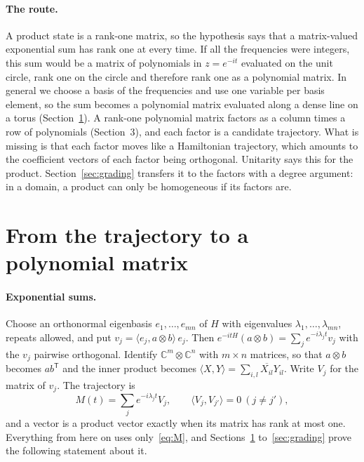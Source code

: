 \documentclass[11pt]{article}
\theoremstyle{remark}
\newcommand{\C}{\mathbb{C}}
\newcommand{\ip}[2]{\langle #1,#2\rangle}
\begin{document}
\paragraph{The route.} A product state is a rank-one matrix, so the hypothesis says that a
matrix-valued exponential sum has rank one at every time. If all the frequencies were integers,
this sum would be a matrix of polynomials in $z=e^{-it}$ evaluated on the unit circle, rank one
on the circle and therefore rank one as a polynomial matrix. In general we choose a basis of the
frequencies and use one variable per basis element, so the sum becomes a polynomial matrix
evaluated along a dense line on a torus (Section~\ref{sec:poly}). A rank-one polynomial matrix
factors as a column times a row of polynomials (Section~3), and each factor is a candidate
trajectory. What is missing is that each factor moves like a Hamiltonian trajectory, which
amounts to the coefficient vectors of each factor being orthogonal. Unitarity says this for the
product. Section~\ref{sec:grading} transfers it to the factors with a degree argument: in a
domain, a product can only be homogeneous if its factors are.

\section{From the trajectory to a polynomial matrix}\label{sec:poly}

\paragraph{Exponential sums.} Choose an orthonormal eigenbasis $e_1,\dots,e_{mn}$ of $H$ with
eigenvalues $\lambda_1,\dots,\lambda_{mn}$, repeats allowed, and put $v_j=\ip{e_j}{a\otimes b}
\,e_j$. Then $e^{-itH}(a\otimes b)=\sum_j e^{-i\lambda_j t}v_j$ with the $v_j$ pairwise
orthogonal. Identify $\C^m\otimes\C^n$ with $m\times n$ matrices, so that $a\otimes b$
becomes $ab^{\mathsf T}$ and the inner product becomes $\ip{X}{Y}=\sum_{i,l}\overline{X_{il}}
Y_{il}$. Write $V_j$ for the matrix of $v_j$. The trajectory is
\begin{equation}\label{eq:M}
M(t)=\sum_j e^{-i\lambda_j t}V_j ,\qquad \ip{V_j}{V_{j'}}=0\ (j\ne j'),
\end{equation}
and a vector is a product vector exactly when its matrix has rank at most one. Everything
from here on uses only~\eqref{eq:M}, and Sections~\ref{sec:poly} to~\ref{sec:grading} prove
the following statement about it.
\end{document}
